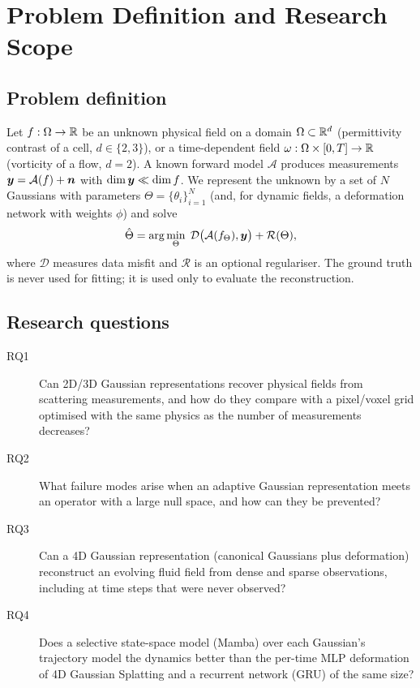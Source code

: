 \chapter{Problem Definition and Research Scope}
\label{ch:problem}

\section{Problem definition}
Let $f:\Omega\to\mathbb{R}$ be an unknown physical field on a domain $\Omega\subset\mathbb{R}^d$ (permittivity contrast of a cell,
$d\in\{2,3\}$), or a time-dependent field $\omega:\Omega\times[0,T]\to\mathbb{R}$ (vorticity of a flow, $d=2$). A known forward
model $\mathcal{A}$ produces measurements $\bm{y}=\mathcal{A}(f)+\bm{n}$ with
$\dim\bm{y}\ll\dim f$. We represent the unknown by a set of $N$ Gaussians with parameters
$\Theta=\{\theta_i\}_{i=1}^N$ (and, for dynamic fields, a deformation network with weights $\phi$) and solve
\begin{equation}
  \hat\Theta = \arg\min_{\Theta}\; \mathcal{D}\big(\mathcal{A}(f_\Theta),\bm{y}\big) + \mathcal{R}(\Theta),
\end{equation}
where $\mathcal{D}$ measures data misfit and $\mathcal{R}$ is an optional regulariser. The ground truth is never used
for fitting; it is used only to evaluate the reconstruction.

\section{Research questions}
\begin{description}
  \item[RQ1] Can 2D/3D Gaussian representations recover physical fields from scattering measurements, and how do they
  compare with a pixel/voxel grid optimised with the same physics as the number of measurements decreases?
  \item[RQ2] What failure modes arise when an adaptive Gaussian representation meets an operator with a large null
  space, and how can they be prevented?
  \item[RQ3] Can a 4D Gaussian representation (canonical Gaussians plus deformation) reconstruct an evolving fluid
  field from dense and sparse observations, including at time steps that were never observed?
  \item[RQ4] Does a selective state-space model (Mamba) over each Gaussian's trajectory model the dynamics better than
  the per-time MLP deformation of 4D Gaussian Splatting and a recurrent network (GRU) of the same size?
\end{description}

